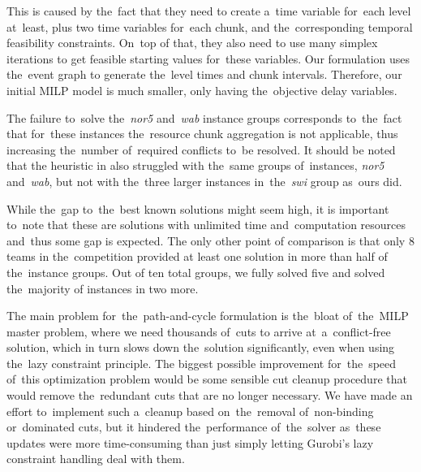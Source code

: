 This is caused by the~fact that they need to create a~time variable for~each level at~least, plus two time variables for~each chunk, and the~corresponding temporal feasibility constraints. On~top of that, they also need to use many simplex iterations to get feasible starting values for~these variables. Our formulation uses the~event graph to generate the~level times and chunk intervals. Therefore, our initial MILP model is much smaller, only having the~objective delay variables.

\newpage
The failure to~solve the~\emph{nor5} and~\emph{wab} instance groups corresponds to~the~fact that for~these instances the~resource chunk aggregation is not applicable, thus increasing the~number of~required conflicts to~be resolved. It should be noted that the heuristic in \textcite{Dubach2025handling} also struggled with the~same groups of~instances, \emph{nor5} and~\emph{wab}, but not with the~three larger instances in~the~\emph{swi} group as~ours did.

While the~gap to~the~best known solutions might seem high, it is important to~note that these are solutions with unlimited time and~computation resources and~thus some gap is expected. The only other point of comparison is that only 8 teams in the~competition provided at least one solution in more than half of the~instance groups. Out of ten total groups, we fully solved five and solved the~majority of instances in two more.

The main problem for~the~path-and-cycle formulation is the~bloat of~the~MILP master problem, where we need thousands of~cuts to arrive at~a~conflict-free solution, which in turn slows down the~solution significantly, even when using the~lazy constraint principle. The biggest possible improvement for~the~speed of~this optimization problem would be some sensible cut cleanup procedure that would remove the~redundant cuts that are no longer necessary. We have made an effort to~implement such a~cleanup based on~the~removal of~non-binding or~dominated cuts, but it hindered the~performance of~the~solver as~these updates were more time-consuming than just simply letting Gurobi's lazy constraint handling deal with them.

